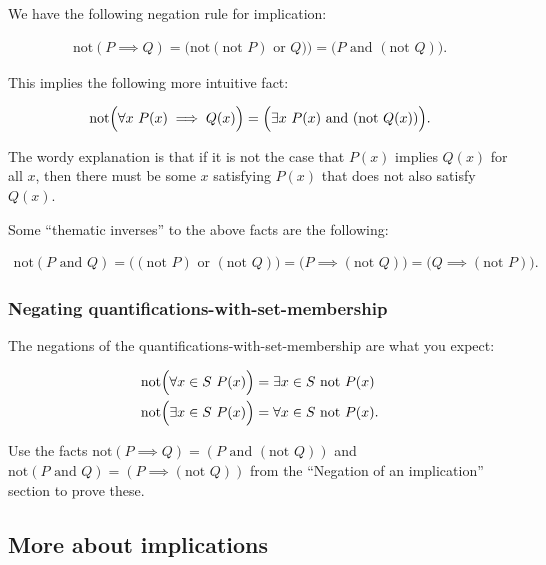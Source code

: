 We have the following negation rule for implication:

\begin{align*}
    \text{not}(P \implies Q) = \Big(\text{not}(\text{not } P) \text{ or } Q)\Big) = \Big(P \text{ and } (\text{not } Q)\Big).
\end{align*}

This implies the following more intuitive fact:

\begin{align*}
    \text{not}\Big(\forall x \text{ } P(x) \implies Q(x) \Big) = \Big(\exists x \text{ } P(x) \text{ and } (\text{not } Q(x))\Big).
\end{align*}

The wordy explanation is that if it is not the case that $P(x)$ implies $Q(x)$ for all $x$, then there must be some $x$ satisfying $P(x)$ that does not also satisfy $Q(x)$.

Some ``thematic inverses'' to the above facts are the following:

\begin{align*}
    \text{not}(P \text{ and } Q) = \Big((\text{not } P) \text{ or } (\text{not } Q)\Big) = \Big(P \implies (\text{not } Q)\Big) = \Big(Q \implies (\text{not } P)\Big).
\end{align*}

\subsubsection*{Negating quantifications-with-set-membership}

The negations of the quantifications-with-set-membership are what you expect:

\begin{align*}
    &\text{not}\Big( \forall x \in S \text{ } P(x) \Big) = \exists x \in S \text{ } \text{not } P(x) \\
    &\text{not}\Big( \exists x \in S \text{ } P(x) \Big) = \forall x \in S \text{ } \text{not } P(x).
\end{align*}

Use the facts $\text{not}(P \implies Q) = (P \text{ and } (\text{not } Q))$ and $\text{not}(P \text{ and } Q) = (P \implies (\text{not } Q))$ from the ``Negation of an implication'' section to prove these.

\newpage

\subsection*{More about implications}

